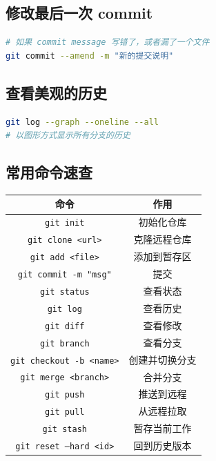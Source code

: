 \documentclass[a4paper,12pt]{ctexart}
\begin{document}
\subsection*{修改最后一次 commit}

\begin{lstlisting}[language=bash]
# 如果 commit message 写错了，或者漏了一个文件
git commit --amend -m "新的提交说明"
\end{lstlisting}

\subsection*{查看美观的历史}

\begin{lstlisting}[language=bash]
git log --graph --oneline --all
# 以图形方式显示所有分支的历史
\end{lstlisting}

\subsection*{常用命令速查}

\begin{center}
\begin{tabular}{|c|c|}
\hline
\textbf{命令} & \textbf{作用} \\ \hline
\texttt{git init} & 初始化仓库 \\ \hline
\texttt{git clone <url>} & 克隆远程仓库 \\ \hline
\texttt{git add <file>} & 添加到暂存区 \\ \hline
\texttt{git commit -m "msg"} & 提交 \\ \hline
\texttt{git status} & 查看状态 \\ \hline
\texttt{git log} & 查看历史 \\ \hline
\texttt{git diff} & 查看修改 \\ \hline
\texttt{git branch} & 查看分支 \\ \hline
\texttt{git checkout -b <name>} & 创建并切换分支 \\ \hline
\texttt{git merge <branch>} & 合并分支 \\ \hline
\texttt{git push} & 推送到远程 \\ \hline
\texttt{git pull} & 从远程拉取 \\ \hline
\texttt{git stash} & 暂存当前工作 \\ \hline
\texttt{git reset --hard <id>} & 回到历史版本 \\ \hline
\end{tabular}
\end{center}
\end{document}

